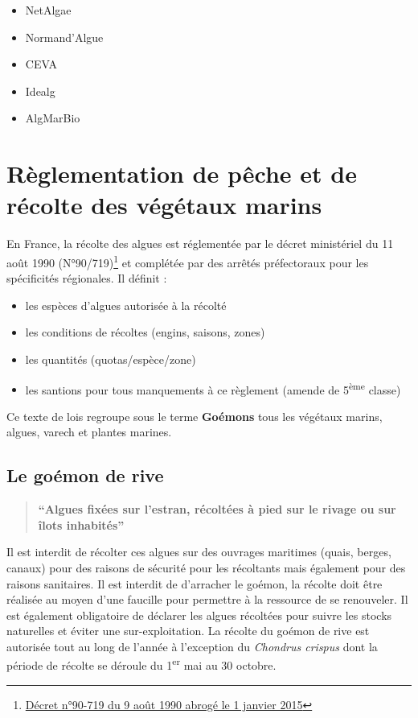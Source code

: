 \documentclass[
]{book}
\providecommand{\tightlist}{%
  \setlength{\itemsep}{0pt}\setlength{\parskip}{0pt}}
\begin{document}
\begin{itemize}
\tightlist
\item
  NetAlgae
\item
  Normand'Algue
\item
  CEVA
\item
  Idealg
\item
  AlgMarBio
\end{itemize}

\hypertarget{ruxe8glementation-de-puxeache-et-de-ruxe9colte-des-vuxe9guxe9taux-marins}{%
\section{Règlementation de pêche et de récolte des végétaux marins}\label{ruxe8glementation-de-puxeache-et-de-ruxe9colte-des-vuxe9guxe9taux-marins}}

En France, la récolte des algues est réglementée par le décret ministériel du 11 août 1990 (N°90/719)\footnote{\href{https://www.lejpgrance.gouv.fr/affichTexte.do?cidTexte=LEGITEXT000006076323}{Décret n°90-719 du 9 août 1990 abrogé le 1 janvier 2015}} et complétée par des arrêtés préfectoraux pour les spécificités régionales. Il définit :

\begin{itemize}
\tightlist
\item
  les espèces d'algues autorisée à la récolté
\item
  les conditions de récoltes (engins, saisons, zones)
\item
  les quantités (quotas/espèce/zone)
\item
  les santions pour tous manquements à ce règlement (amende de 5\textsuperscript{ème} classe)
\end{itemize}

Ce texte de lois regroupe sous le terme \textbf{Goémons} tous les végétaux marins, algues, varech et plantes marines.

\hypertarget{le-gouxe9mon-de-rive}{%
\subsection{Le goémon de rive}\label{le-gouxe9mon-de-rive}}

\begin{quote}
\textbf{``Algues fixées sur l'estran, récoltées à pied sur le rivage ou sur îlots inhabités''}
\end{quote}

Il est interdit de récolter ces algues sur des ouvrages maritimes (quais, berges, canaux) pour des raisons de sécurité pour les récoltants mais également pour des raisons sanitaires. Il est interdit de d'arracher le goémon, la récolte doit être réalisée au moyen d'une faucille pour permettre à la ressource de se renouveler. Il est également obligatoire de déclarer les algues récoltées pour suivre les stocks naturelles et éviter une sur-exploitation.
La récolte du goémon de rive est autorisée tout au long de l'année à l'exception du \emph{Chondrus crispus} dont la période de récolte se déroule du 1\textsuperscript{er} mai au 30 octobre.
\end{document}
